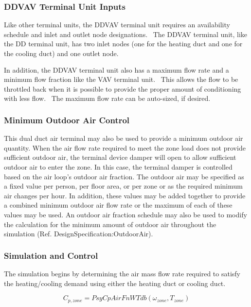 \subsubsection{DDVAV Terminal Unit Inputs}\label{ddvav-terminal-unit-inputs}

Like other terminal units, the DDVAV terminal unit requires an availability schedule and inlet and outlet node designations.~ The DDVAV terminal unit, like the DD terminal unit, has two inlet nodes (one for the heating duct and one for the cooling duct) and one outlet node.

In addition, the DDVAV terminal unit also has a maximum flow rate and a minimum flow fraction like the VAV terminal unit.~ This allows the flow to be throttled back when it is possible to provide the proper amount of conditioning with less flow.~ The maximum flow rate can be auto-sized, if desired.

\subsubsection{Minimum Outdoor Air Control}\label{minimum-outdoor-air-control-1}

This dual duct air terminal may also be used to provide a minimum outdoor air quantity. When the air flow rate required to meet the zone load does not provide sufficient outdoor air, the terminal device damper will open to allow sufficient outdoor air to enter the zone. In this case, the terminal damper is controlled based on the air loop's outdoor air fraction. The outdoor air may be specified as a fixed value per person, per floor area, or per zone or as the required minimum air changes per hour. In addition, these values may be added together to provide a combined minimum outdoor air flow rate or the maximum of each of these values may be used. An outdoor air fraction schedule may also be used to modify the calculation for the minimum amount of outdoor air throughout the simulation (Ref. DesignSpecification:OutdoorAir).

\subsubsection{Simulation and Control}\label{simulation-and-control-6}

The simulation begins by determining the air mass flow rate required to satisfy the heating/cooling demand using either the heating duct or cooling duct.

\begin{equation}
C_{p,zone} = PsyCpAirFnWTdb\left( {\omega_{zone}},{T_{zone}} \right)
\end{equation}

